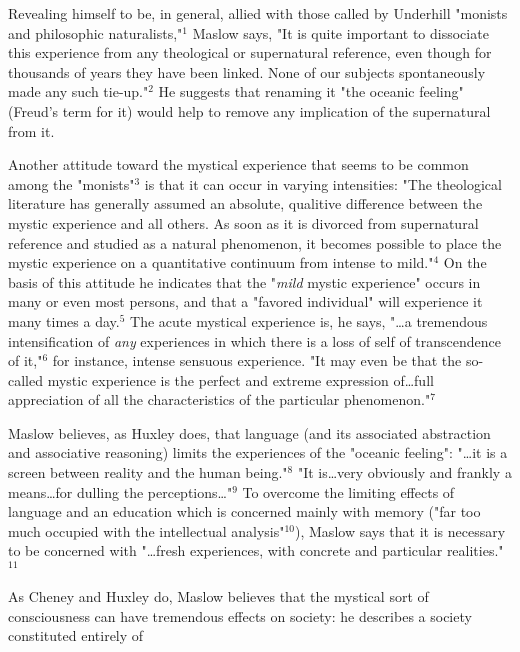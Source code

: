Revealing himself to be, in general, allied with those
called by Underhill "monists and philosophic naturalists,"$^{1}$
Maslow says, "It is quite important to dissociate this experience
from any theological or supernatural reference, even
though for thousands of years they have been linked. None
of our subjects spontaneously made any such tie-up."$^{2}$
He suggests that renaming it "the oceanic feeling" (Freud's term for it)
would help to remove any implication of the supernatural from it.\par
\vspace*{0.5\baselineskip}
Another attitude toward the mystical experience that seems to be
common among the "monists"$^{3}$ is that it can occur
in varying intensities: "The theological literature has
generally assumed an absolute, qualitive difference between the
mystic experience and all others. As soon as it is divorced from
supernatural reference and studied as a natural phenomenon,
it becomes possible to place the mystic experience
on a quantitative continuum from intense to mild."$^{4}$ On the basis
of this attitude he indicates that the "\textit{mild} mystic experience"
occurs in many or even most persons, and that a "favored individual"
will experience it many times a day.$^{5}$ The acute mystical experience
is, he says, "\dots a tremendous intensification of \textit{any} experiences in which there
is a loss of self of transcendence of it,"$^{6}$ for instance, intense sensuous experience.
"It may even be that the so-called mystic experience is the perfect and extreme
expression of\dots full appreciation of all the characteristics of the particular phenomenon."$^{7}$\par
\vspace*{0.5\baselineskip}
Maslow believes, as Huxley does, that language (and its associated abstraction and associative reasoning)
limits the experiences of the "oceanic feeling": "\dots it is a screen
between reality and the human being."$^{8}$ "It is\dots very obviously
and frankly a means\dots for dulling the perceptions\dots"$^{9}$
To overcome the limiting effects of language and an education which is
concerned mainly with memory ("far too much occupied with the intellectual analysis"$^{10}$), Maslow says that it is necessary
to be concerned with "\dots fresh experiences, with concrete and particular realities."$^{11}$\par
\vspace*{0.5\baselineskip}
As Cheney and Huxley do, Maslow believes that the mystical sort of consciousness
can have tremendous effects on society: he describes a society constituted entirely of
